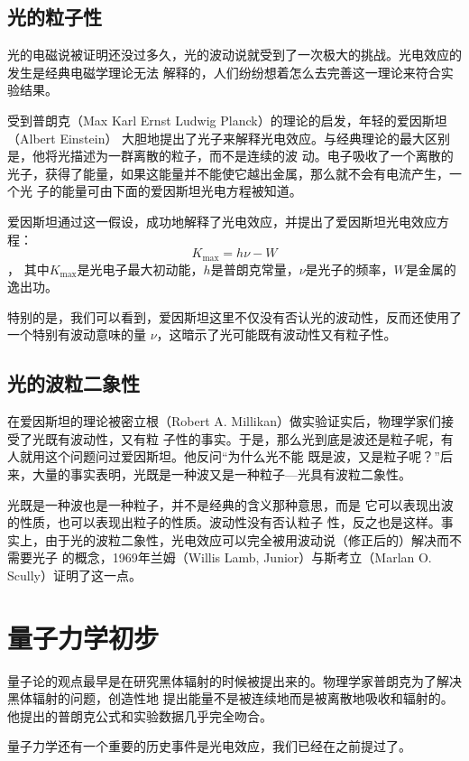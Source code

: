 \subsection{光的粒子性}
光的电磁说被证明还没过多久，光的波动说就受到了一次极大的挑战。光电效应的发生是经典电磁学理论无法
解释的，人们纷纷想着怎么去完善这一理论来符合实验结果。

受到普朗克（Max Karl Ernst Ludwig Planck）的理论的启发，年轻的爱因斯坦（Albert Einstein）
大胆地提出了光子来解释光电效应。与经典理论的最大区别是，他将光描述为一群离散的粒子，而不是连续的波
动。电子吸收了一个离散的光子，获得了能量，如果这能量并不能使它越出金属，那么就不会有电流产生，一个光
子的能量可由下面的爱因斯坦光电方程被知道。

爱因斯坦通过这一假设，成功地解释了光电效应，并提出了爱因斯坦光电效应方程：
\begin{equation}
K_{\text{max}} = h\nu - W
\end{equation}，
其中$K_{\text{max}}$是光电子最大初动能，$h$是普朗克常量，$\nu$是光子的频率，$W$是金属的逸出功。

特别的是，我们可以看到，爱因斯坦这里不仅没有否认光的波动性，反而还使用了一个特别有波动意味的量
$\nu$，这暗示了光可能既有波动性又有粒子性。

\subsection{光的波粒二象性}
在爱因斯坦的理论被密立根（Robert A. Millikan）做实验证实后，物理学家们接受了光既有波动性，又有粒
子性的事实。于是，那么光到底是波还是粒子呢，有人就用这个问题问过爱因斯坦。他反问``为什么光不能
既是波，又是粒子呢？''后来，大量的事实表明，光既是一种波又是一种粒子---光具有波粒二象性。

光既是一种波也是一种粒子，并不是经典的含义那种意思，而是
它可以表现出波的性质，也可以表现出粒子的性质。波动性没有否认粒子
性，反之也是这样。事实上，由于光的波粒二象性，光电效应可以完全被用波动说（修正后的）解决而不需要光子
的概念，1969年兰姆（Willis Lamb, Junior）与斯考立（Marlan O. Scully）证明了这一点。

\section{量子力学初步}
量子论的观点最早是在研究黑体辐射的时候被提出来的。物理学家普朗克为了解决黑体辐射的问题，创造性地
提出能量不是被连续地而是被离散地吸收和辐射的。他提出的普朗克公式和实验数据几乎完全吻合。

量子力学还有一个重要的历史事件是光电效应，我们已经在之前提过了。

